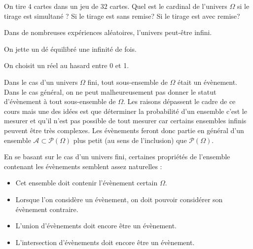 \documentclass[a4paper,10pt]{report}
\begin{document}
\begin{itemize}
\begin{Exemple}
On tire $4$ cartes dans un jeu de $32$ cartes. Quel est le cardinal de l'univers $\Omega$ si le tirage est simultané ? Si le tirage est sans remise? Si le tirage est avec remise?

\vspace{3cm}

\end{Exemple}

\medskip

Dans de nombreuses expériences aléatoires, l'univers peut-être infini.

\vspace{0.2cm}

\begin{exems}
\item On jette un dé équilibré une infinité de fois.
\item On choisit un réel au hasard entre 0 et 1.
\end{exems}

\medskip

Dans le cas d'un univers $\Omega$ fini, tout sous-ensemble de $\Omega$ était un évènement. Dans le cas général, on ne peut malheureusement pas donner le statut d'évènement à tout sous-ensemble de $\Omega$. Les raisons dépassent le cadre de ce cours mais une des idées est que déterminer la probabilité d'un ensemble c'est le mesurer et qu'il n'est pas possible de \og tout mesurer \fg car certains ensembles infinis peuvent être très complexes. Les évènements feront donc partie en général d'un ensemble $\mathcal{A} \subset \mathcal{P}(\Omega)$ plus petit (au sens de l'inclusion) que $\mathcal{P}(\Omega)$.

\medskip

En se basant sur le cas d'un univers fini, certaines propriétés de l'ensemble contenant les évènements semblent assez \og naturelles \fg :

\vspace{0.2cm}

\begin{itemize}
\item Cet ensemble doit contenir l'évènement certain $\Omega$.
\item Lorsque l'on considère un évènement, on doit pouvoir considérer son évènement contraire.
\item L'union d'évènements doit encore être un évènement.
\item L'intersection d'évènements doit encore être un évènement.
\end{itemize}


\end{itemize}
\end{document}
